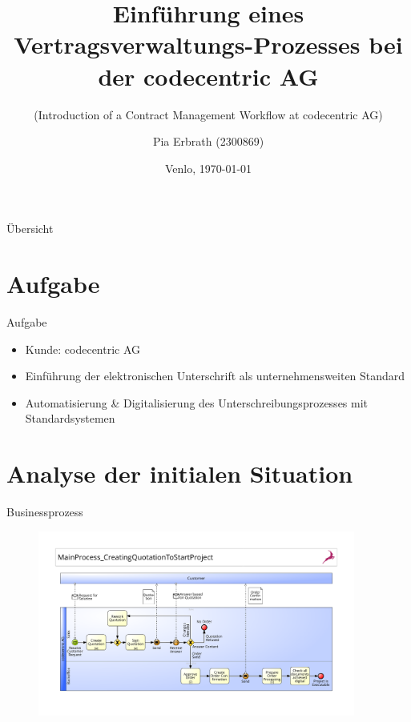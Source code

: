 \documentclass[utf8, xcolor, usenames,dvipsnames, aspectratio=169, notes, ]{beamer}
\title
  [Vertragsverwaltungs-Prozess]{Einführung eines Vertragsverwaltungs-Prozesses \centering bei der codecentric AG}
\subtitle{(Introduction of a Contract Management Workflow
  	at codecentric AG)}
\author
  [Pia Erbrath]
  {Pia Erbrath (2300869)}
\date
  {Venlo, \today}
\institute
  {FHTenL Venlo}
\begin{document}
\maketitle

\begin{frame}{Übersicht}

  \tableofcontents

\end{frame}

\section{Aufgabe}
\begin{frame}{Aufgabe}
	\begin{itemize}
		\item Kunde: codecentric AG
		\item Einführung der elektronischen Unterschrift als unternehmensweiten Standard
		\item Automatisierung \& Digitalisierung des Unterschreibungsprozesses \newline mit Standardsystemen 
	\end{itemize}
\end{frame}

\section{Analyse der initialen Situation}
\begin{frame}{Businessprozess}
	\begin{figure}
		\centering
		\colorbox{white}{\includegraphics[width=0.93\textwidth, height=0.78\textheight]{./images/0_main}}
	\end{figure}
\end{frame}
\end{document}
